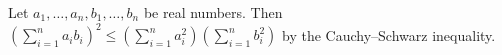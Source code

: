 Let $a_{1}, \ldots, a_{n}, b_{1}, \ldots, b_{n}$ be real numbers.
Then $(\sum_{i=1}^{n} a_{i} b_{i})^{2} \leq (\sum_{i=1}^{n} a_{i}^{2})(\sum_{i=1}^{n} b_{i}^{2})$ by the Cauchy–Schwarz inequality.
